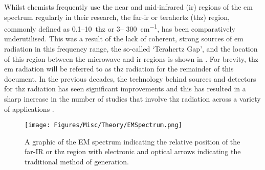 Whilst chemists frequently use the near and mid\nobreakdash-infrared (\acrshort{ir}) regions of the \acrfull{em} spectrum regularly in their research, the far\nobreakdash-\acrshort{ir} or terahertz (\acrshort{thz}) region, commonly defined as 0.1\nobreakdash--\SI{10}{\acrshort{thz}} or 3\nobreakdash--\DIFdelbegin %
\DIFdelend \DIFaddbegin \SI{300}{cm^{-1}}\DIFaddend , has been comparatively underutilised. This was a result of the lack of coherent, strong sources of \acrshort{em} radiation in this frequency range, the so\nobreakdash-called `Terahertz Gap', and the location of this region between the microwave and \acrshort{ir} regions is shown in . For brevity, \acrshort{thz} \acrshort{em} radiation will be referred to as \acrshort{thz} radiation for the remainder of this document. In the previous decades, the technology behind sources and detectors for \acrshort{thz} radiation has seen significant improvements and this has resulted in a sharp increase in the number of studies that involve \acrshort{thz} radiation across a variety of applications \DIFdelbegin \DIFdel{~}\DIFdelend \cite{Lewis2014}. 

\begin{figure}
    \centering
    \texttt{[image: Figures/Misc/Theory/EMSpectrum.png]}
    \captionsetup{font = footnotesize, justification = centering}
    \caption[A Graphic of the Electromagnetic Spectrum]{A graphic of the EM spectrum indicating the relative position of the far-IR or \acrshort{thz} region with electronic and optical arrows indicating the traditional method of generation.}
    \label{fig:emspectrum}
\end{figure}

